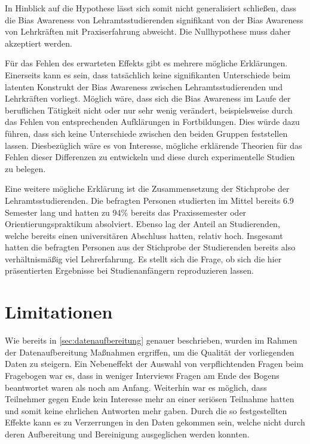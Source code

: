 In Hinblick auf die Hypothese lässt sich somit nicht generalisiert schließen, dass die Bias Awareness von Lehramtsstudierenden signifikant von der Bias Awareness von Lehrkräften mit Praxiserfahrung abweicht.
Die Nullhypothese muss daher akzeptiert werden.

Für das Fehlen des erwarteten Effekts gibt es mehrere mögliche Erklärungen.
Einerseits kann es sein, dass tatsächlich keine signifikanten Unterschiede beim latenten Konstrukt der Bias Awareness zwischen Lehramtsstudierenden und Lehrkräften vorliegt.
Möglich wäre, dass sich die Bias Awareness im Laufe der beruflichen Tätigkeit nicht oder nur sehr wenig verändert, beispielsweise durch das Fehlen von entsprechenden Aufklärungen in Fortbildungen.
Dies würde dazu führen, dass sich keine Unterschiede zwischen den beiden Gruppen feststellen lassen.
Diesbezüglich wäre es von Interesse, mögliche erklärende Theorien für das Fehlen dieser Differenzen zu entwickeln und diese durch experimentelle Studien zu belegen.

Eine weitere mögliche Erklärung ist die Zusammensetzung der Stichprobe der Lehramtsstudierenden.
Die befragten Personen studierten im Mittel bereits 6.9 Semester lang und hatten zu 94\% bereits das Praxissemester oder Orientierungspraktikum absolviert.
Ebenso lag der Anteil an Studierenden, welche bereits einen universitären Abschluss hatten, relativ hoch.
Insgesamt hatten die befragten Personen aus der Stichprobe der Studierenden bereits also verhältnismäßig viel Lehrerfahrung.
Es stellt sich die Frage, ob sich die hier präsentierten Ergebnisse bei Studienanfängern reproduzieren lassen.


\section{Limitationen}
\label{sec:limitationen}

Wie bereits in \autoref{sec:datenaufbereitung} genauer beschrieben, wurden im Rahmen der Datenaufbereitung Maßnahmen ergriffen, um die Qualität der vorliegenden Daten zu steigern.
Ein Nebeneffekt der Auswahl von verpflichtenden Fragen beim Fragebogen war es, dass in weniger Interviews Fragen am Ende des Bogens beantwortet waren als noch am Anfang.
Weiterhin war es möglich, dass Teilnehmer gegen Ende kein Interesse mehr an einer seriösen Teilnahme hatten und somit keine ehrlichen Antworten mehr gaben.
Durch die so festgestellten Effekte kann es zu Verzerrungen in den Daten gekommen sein, welche nicht durch deren Aufbereitung und Bereinigung ausgeglichen werden konnten.

